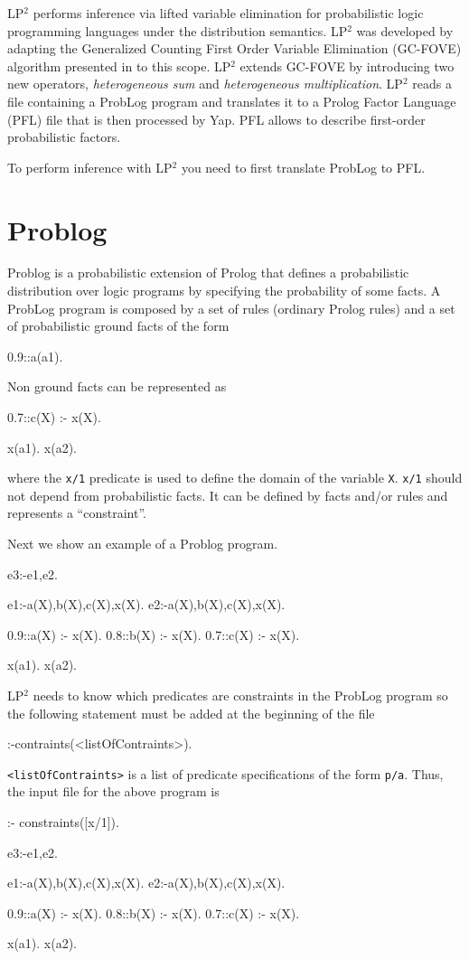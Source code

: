 \documentclass{article}
\begin{document}
LP$^2$ \cite{BelLamRig14-ICLP-IJ} performs inference via lifted variable elimination for probabilistic logic programming languages under the distribution semantics. 
LP$^2$ was developed by adapting the Generalized Counting First Order Variable Elimination (GC-FOVE) algorithm presented in \cite{gcfove} to this scope. 
LP$^2$ extends GC-FOVE by introducing two new operators, \textit{heterogeneous sum} and \textit{heterogeneous multiplication}.
LP$^2$ reads a file containing a ProbLog program and translates it to a Prolog Factor Language (PFL) file that is then processed by Yap.
PFL allows to describe first-order probabilistic factors. 

To perform inference with LP$^2$ you need to first translate ProbLog to PFL.
\section{Problog}
Problog is a probabilistic extension of Prolog that defines a probabilistic distribution over logic programs by specifying the probability of some facts.
A ProbLog program is composed by a set of rules (ordinary Prolog rules) and a set of probabilistic ground facts of the form
\begin{pflcode}
0.9::a(a1).
\end{pflcode}
Non ground facts can be represented as
\begin{pflcode}
0.7::c(X) :- x(X).

x(a1).
x(a2).
\end{pflcode}
where the \verb|x/1| predicate is used to define the domain of the variable \verb|X|. \verb|x/1|  should not depend from probabilistic facts. It can be defined
by facts and/or rules and represents a ``constraint''.

Next we show an example of a Problog program.
\begin{pflcode}
e3:-e1,e2.

e1:-a(X),b(X),c(X),x(X).
e2:-a(X),b(X),c(X),x(X).

0.9::a(X) :- x(X).
0.8::b(X) :- x(X).
0.7::c(X) :- x(X).

x(a1).
x(a2).
\end{pflcode}


LP$^2$ needs to know which predicates are constraints in the ProbLog program so the following statement must be added at the beginning of the file
\begin{pflcode}
 :-contraints(<listOfContraints>).
\end{pflcode}
\texttt{<listOfContraints>} is a list of predicate specifications of the form \verb|p/a|.
Thus, the input file for the above program is
\begin{pflcode}
:- constraints([x/1]).

e3:-e1,e2.

e1:-a(X),b(X),c(X),x(X).
e2:-a(X),b(X),c(X),x(X).

0.9::a(X) :- x(X).
0.8::b(X) :- x(X).
0.7::c(X) :- x(X).

x(a1).
x(a2).
\end{pflcode}
\end{document}
